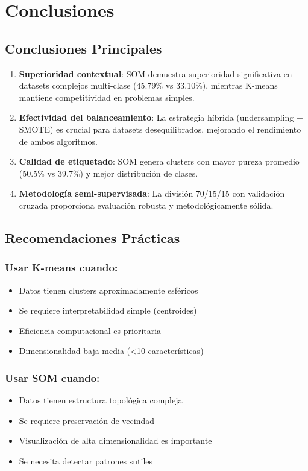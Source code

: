 \documentclass[12pt,a4paper]{article}
\begin{document}
\section{Conclusiones}

\subsection{Conclusiones Principales}

\begin{enumerate}
    \item \textbf{Superioridad contextual}: SOM demuestra superioridad significativa en datasets complejos multi-clase (45.79\% vs 33.10\%), mientras K-means mantiene competitividad en problemas simples.
    
    \item \textbf{Efectividad del balanceamiento}: La estrategia híbrida (undersampling + SMOTE) es crucial para datasets desequilibrados, mejorando el rendimiento de ambos algoritmos.
    
    \item \textbf{Calidad de etiquetado}: SOM genera clusters con mayor pureza promedio (50.5\% vs 39.7\%) y mejor distribución de clases.
    
    \item \textbf{Metodología semi-supervisada}: La división 70/15/15 con validación cruzada proporciona evaluación robusta y metodológicamente sólida.
\end{enumerate}

\subsection{Recomendaciones Prácticas}

\subsubsection{Usar K-means cuando:}
\begin{itemize}
    \item Datos tienen clusters aproximadamente esféricos
    \item Se requiere interpretabilidad simple (centroides)
    \item Eficiencia computacional es prioritaria
    \item Dimensionalidad baja-media (<10 características)
\end{itemize}

\subsubsection{Usar SOM cuando:}
\begin{itemize}
    \item Datos tienen estructura topológica compleja
    \item Se requiere preservación de vecindad
    \item Visualización de alta dimensionalidad es importante
    \item Se necesita detectar patrones sutiles
\end{itemize}
\end{document}
